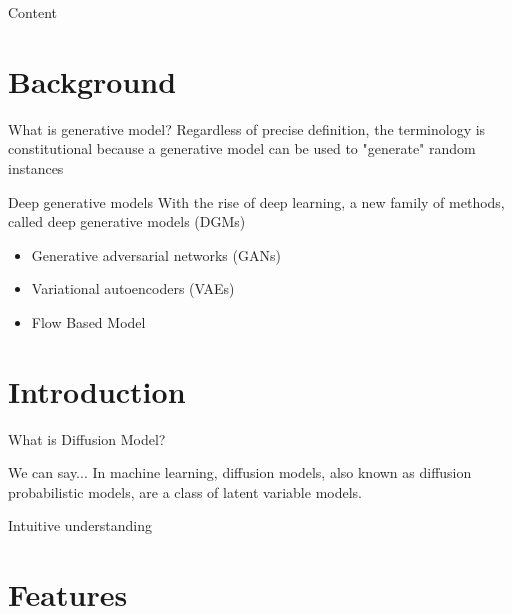 \documentclass[aspectratio=169]{beamer}
\begin{document}
\begin{frame}{Content}
    \tableofcontents[hideallsubsections]
\end{frame}

\section{Background}

\begin{frame}{What is generative model?}
    Regardless of precise definition, the terminology is constitutional because a generative model can be used to "generate" random instances
\end{frame}
\begin{frame}{Deep generative models}
    With the rise of deep learning, a new family of methods, called deep generative models (DGMs)
    \begin{itemize}
        \item Generative adversarial networks (GANs)
        \item Variational autoencoders (VAEs)
        \item Flow Based Model
    \end{itemize}
\end{frame}

\section{Introduction}
\begin{frame}{What is Diffusion Model?}
    \begin{block}{We can say...}
        In machine learning, diffusion models, also known as diffusion probabilistic models, are a class of latent variable models.
    \end{block}
\end{frame}

\begin{frame}{Intuitive understanding}
\end{frame}
\section{Features}
\end{document}
